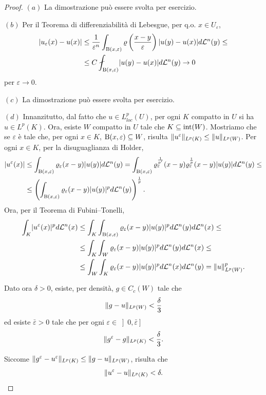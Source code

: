 \begin{proof}\hfill
	\par\noindent 
	$(a)$ La dimostrazione può essere svolta per esercizio.
	\par\noindent
	$(b)$ Per il Teorema di differenziabilità di Lebesgue, per q.o. $x \in U_{\varepsilon}$,
	\begin{align*}
		\abs{u_\varepsilon(x) - u(x)} &\le \frac{1}{\varepsilon^n} \int_{\textup{B}(x,\varepsilon)} \varrho\left( \frac{x-y}{\varepsilon}\right) \abs{u(y)-u(x)}d\mathcal{L}^n(y) \le \\
		&\le C \fint_{\textup{B}(x,\varepsilon)} \abs{u(y)-u(x)}d\mathcal{L}^n(y) \to 0
	\end{align*}
	per $\varepsilon \to 0$. 
	\par\noindent
	$(c)$ La dimostrazione può essere svolta per esercizio.
	\par\noindent
	$(d)$ Innanzitutto, dal fatto che $u \in L^p_{loc}(U)$, per ogni $K$ compatto in $U$ si ha $u \in L^p(K)$. Ora, esiste $W$ compatto in $U$ tale che $K \subseteq \textup{int}(W)$. Mostriamo che se $\varepsilon$ è tale che, per ogni $x \in K$, $\textup{B}(x,\varepsilon)\subseteq W$, risulta $\lVert u^\varepsilon\rVert_{L^p(K)} \le \lVert u\rVert_{L^p(W)}$. Per ogni $x \in K$, per la disuguaglianza di Holder, 
	\begin{align*}
		\lvert u^\varepsilon(x)\rvert &\le \int_{\textup{B}(x,\varepsilon)} \varrho_\varepsilon(x-y)\lvert u(y)\rvert d\mathcal{L}^n(y) = \int_{\textup{B}(x,\varepsilon)}\varrho^{\frac{1}{p'}}_\varepsilon(x-y)\varrho^{\frac{1}{p}}_\varepsilon(x-y)\lvert u(y)\rvert d\mathcal{L}^n(y) \le \\
		&\le \left( \int_{\textup{B}(x,\varepsilon)}\varrho_\varepsilon(x-y)\lvert u(y)\rvert^pd\mathcal{L}^n(y)\right) ^{\frac{1}{p}}.
	\end{align*} 
	Ora, per il Teorema di Fubini--Tonelli,
	\begin{align*}
		\int_K \lvert u^\varepsilon(x)\rvert^pd\mathcal{L}^n(x) &\le \int_K \int_{\textup{B}(x,\varepsilon)}\varrho_\varepsilon(x-y)\lvert u(y)\rvert^pd\mathcal{L}^n(y) d\mathcal{L}^n(x) \le \\
		& \le \int_K \int_{W}\varrho_\varepsilon(x-y)\lvert u(y)\rvert^pd\mathcal{L}^n(y)  d\mathcal{L}^n(x) \le \\
		& \le \int_W \int_{K}\varrho_\varepsilon(x-y)\lvert u(y)\rvert^pd\mathcal{L}^n(x)  d\mathcal{L}^n(y) = \lVert u\rVert_{L^p(W)}^p.
	\end{align*}
	
	Dato ora $\delta > 0$, esiste, per densità, $g \in C_c(W)$ tale che 
	\[ \lVert g-u\rVert_{L^p(W)} < \frac{\delta}{3} \]
	ed esiste $\bar{\varepsilon}>0$ tale che per ogni $\varepsilon \in \left] 0,\bar{\varepsilon}\right] $
	\[ \lVert g^\varepsilon - g \rVert_{L^p(K)} <   \frac{\delta}{3}.\]
	
	Siccome $\lVert g^\varepsilon - u^\varepsilon\rVert_{L^p(K)} \le \lVert g - u\rVert_{L^p(W)}$, risulta che 
	\[ \lVert u^\varepsilon - u\rVert_{L^p(K)} < \delta.\qedhere \]
\end{proof}
